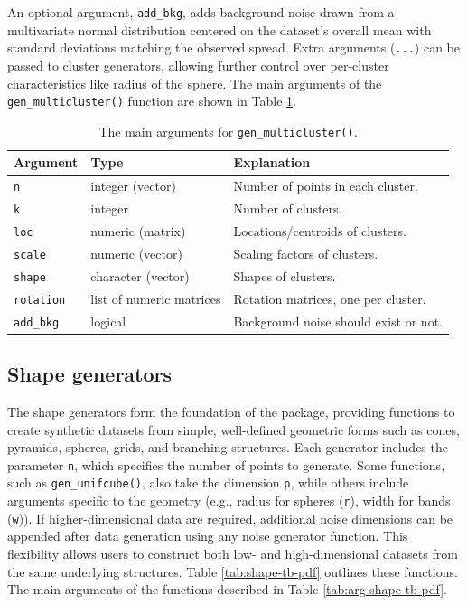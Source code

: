 An optional argument, \texttt{add\_bkg}, adds background noise drawn from a multivariate normal distribution centered on the dataset's overall mean with standard deviations matching the observed spread. Extra arguments (\texttt{...}) can be passed to cluster generators, allowing further control over per-cluster characteristics like radius of the sphere. The main arguments of the \texttt{gen\_multicluster()} function are shown in Table \ref{tab:main-tb-pdf}.

\begin{table}

\caption{\label{tab:main-tb-pdf}The main arguments for \texttt{gen\_multicluster()}.}
\centering
\begin{tabular}[t]{>{\raggedright\arraybackslash}p{2cm}>{\raggedright\arraybackslash}p{3cm}>{\raggedright\arraybackslash}p{8cm}}
\toprule
Argument & Type & Explanation\\
\midrule
\texttt{n} & integer (vector) & Number of points in each cluster.\\
\texttt{k} & integer & Number of clusters.\\
\texttt{loc} & numeric (matrix) & Locations/centroids of clusters.\\
\texttt{scale} & numeric (vector) & Scaling factors of clusters.\\
\texttt{shape} & character (vector) & Shapes of clusters.\\
\texttt{rotation} & list of numeric matrices & Rotation matrices, one per cluster.\\
\texttt{add\_bkg} & logical & Background noise should exist or not.\\
\bottomrule
\end{tabular}
\end{table}

\subsection{Shape generators}\label{shape-generators}

The shape generators form the foundation of the package, providing functions to create synthetic datasets from simple, well-defined geometric forms such as cones, pyramids, spheres, grids, and branching structures. Each generator includes the parameter \texttt{n}, which specifies the number of points to generate. Some functions, such as \texttt{gen\_unifcube()}, also take the dimension \texttt{p}, while others include arguments specific to the geometry (e.g., radius for spheres (\texttt{r}), width for bands (\texttt{w})). If higher-dimensional data are required, additional noise dimensions can be appended after data generation using any noise generator function. This flexibility allows users to construct both low- and high-dimensional datasets from the same underlying structures. Table \ref{tab:shape-tb-pdf} outlines these functions. The main arguments of the functions described in Table \ref{tab:arg-shape-tb-pdf}.


